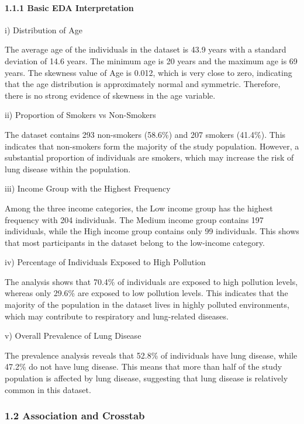 \paragraph{1.1.1 Basic EDA
Interpretation}\label{basic-eda-interpretation}

i) Distribution of Age

The average age of the individuals in the dataset is 43.9 years with a
standard deviation of 14.6 years. The minimum age is 20 years and the
maximum age is 69 years. The skewness value of Age is 0.012, which is
very close to zero, indicating that the age distribution is
approximately normal and symmetric. Therefore, there is no strong
evidence of skewness in the age variable.

ii) Proportion of Smokers vs Non-Smokers

The dataset contains 293 non-smokers (58.6\%) and 207 smokers (41.4\%).
This indicates that non-smokers form the majority of the study
population. However, a substantial proportion of individuals are
smokers, which may increase the risk of lung disease within the
population.

iii) Income Group with the Highest Frequency

Among the three income categories, the Low income group has the highest
frequency with 204 individuals. The Medium income group contains 197
individuals, while the High income group contains only 99 individuals.
This shows that most participants in the dataset belong to the
low-income category.

iv) Percentage of Individuals Exposed to High Pollution

The analysis shows that 70.4\% of individuals are exposed to high
pollution levels, whereas only 29.6\% are exposed to low pollution
levels. This indicates that the majority of the population in the
dataset lives in highly polluted environments, which may contribute to
respiratory and lung-related diseases.

v) Overall Prevalence of Lung Disease

The prevalence analysis reveals that 52.8\% of individuals have lung
disease, while 47.2\% do not have lung disease. This means that more
than half of the study population is affected by lung disease,
suggesting that lung disease is relatively common in this dataset.

\subsubsection{1.2 Association and
Crosstab}\label{association-and-crosstab}


